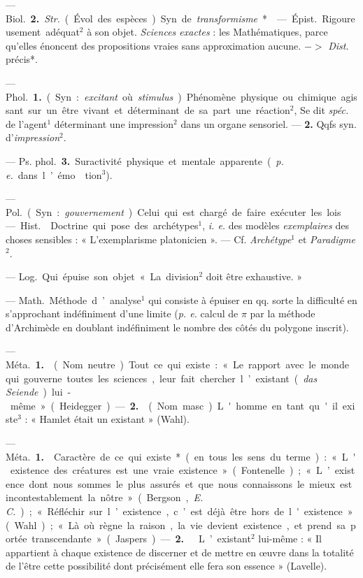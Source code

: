 \begin{itemize}[leftmargin=1cm, label=, itemsep=1pt]
— \si{Biol.} {\bf 2.} {\it Str.} (Évol. des espèces)
Syn. de {\it transformisme}*.

 — \si{Épist.} Rigoureusement adéquat$^2$ à son objet.
{\it Sciences exactes} :
les Mathématiques, parce qu'elles
énoncent des propositions vraies sans
approximation aucune. $->$ {\it Dist.}
précis*.

 — \si{Phol.} {\bf 1.} (Syn. : {\it excitant} où
{\it stimulus}). Phénomène physique ou chimique agissant sur un
être vivant et déterminant de sa part
une réaction$^2$, Se dit {\it spéc.} de l’agent$^1$
déterminant une impression$^2$ dans
un organe sensoriel. — {\bf 2.} Qqfs
syn. d’{\it impression}$^2$.

— \si{Ps. phol.} {\bf 3.} Suractivité physique et mentale apparente
({\it p. e.} dans l’émo\-tion$^3$).

 — \si{Pol.} (Syn. : {\it gouvernement}).
Celui qui est chargé de faire exécuter les lois.

 — \si{Hist.}  Doctrine
qui pose des archétypes$^1$, {\it i. e.} des
modèles {\it exemplaires} des choses sensibles : « L’exemplarisme platonicien ». — Cf. {\it Archétype}$^1$ et {\it Paradigme}$^2$.

 — \si{Log.} Qui épuise son
objet « La division$^2$ doit être exhaustive. »

 — \si{Math.} Méthode d’analyse$^1$
qui consiste à épuiser en qq.
sorte la difficulté en s’approchant
indéfiniment d’une limite ({\it p. e.} calcul
de $\pi$ par la méthode d’Archimède
en doublant indéfiniment le nombre
des côtés du polygone inscrit).

 — \si{Méta.} {\bf 1.}  (Nom neutre).
Tout ce qui existe : « Le rapport avec le monde qui gouverne
toutes les sciences, leur fait chercher l’existant
({\it das Seiende}) lui-même » (Heidegger). — {\bf 2.} 
(Nom masc.) L'homme en tant qu'il existe$^3$ : « Hamlet était
un existant » (Wahl).

 — \si{Méta.} {\bf 1.}  Caractère de
ce qui existe* (en tous les sens du
terme) : « L'existence des créatures
est une vraie existence. » (Fontenelle); « L’existence dont nous
sommes le plus assurés et que nous
connaissons le mieux est incontestablement la nôtre » (Bergson, {\it E. C.});
« Réfléchir sur l’existence, c’est déjà
être hors de l'existence » (Wahl);
« Là où règne la raison, la vie devient
existence, et prend sa portée transcendante » (Jaspers).
— {\bf 2.}  
L’existant$^2$ lui-même : « Il appartient
à chaque existence de discerner et de
mettre en œuvre dans la totalité de
l'être cette possibilité dont précisément elle fera son essence » (Lavelle).


\end{itemize}
